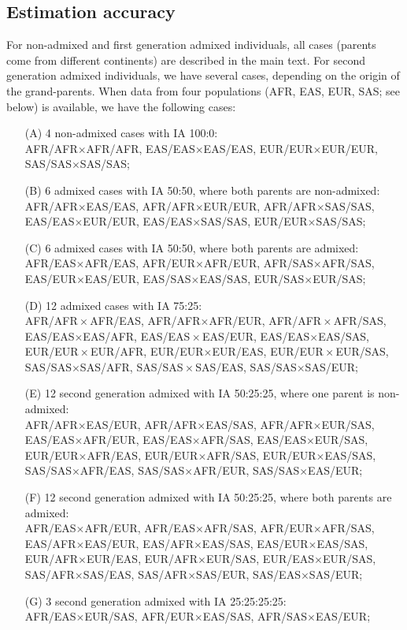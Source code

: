 \documentclass[12pt]{article}
\theoremstyle{definition}
\begin{document}
\newpage

\subsection{Estimation accuracy}
For non-admixed and first generation admixed individuals, all cases (parents come from different continents) are described in the main
text. For second generation admixed individuals, we have several
cases, depending on the origin of the grand-parents.  When data from
four populations (AFR, EAS, EUR, SAS; see below) is available, we have
the following cases:
\begin{itemize}
\item[(A)] 4 non-admixed cases with IA 100:0: \\
  AFR/AFR$\times$AFR/AFR, EAS/EAS$\times$EAS/EAS,
  EUR/EUR$\times$EUR/EUR, SAS/SAS$\times$SAS/SAS;
\item[(B)] 6 admixed cases with IA 50:50, where both
  parents are non-admixed:\\
  AFR/AFR$\times$EAS/EAS, AFR/AFR$\times$EUR/EUR,
  AFR/AFR$\times$SAS/SAS, EAS/EAS$\times$EUR/EUR,
  EAS/EAS$\times$SAS/SAS, EUR/EUR$\times$SAS/SAS;
\item[(C)] 6 admixed cases with IA 50:50, where both
  parents are admixed:\\
  AFR/EAS$\times$AFR/EAS, AFR/EUR$\times$AFR/EUR,
  AFR/SAS$\times$AFR/SAS, EAS/EUR$\times$EAS/EUR,
  EAS/SAS$\times$EAS/SAS, EUR/SAS$\times$EUR/SAS;
\item[(D)] 12 admixed cases with IA 75:25:\\
  AFR/AFR$\!\times$AFR/EAS, AFR/AFR$\times$AFR/EUR,
  AFR/AFR$\!\times$AFR/SAS, EAS/EAS$\times$EAS/AFR,
  EAS/EAS$\!\times$EAS/EUR, EAS/EAS$\times$EAS/SAS,
  EUR/EUR$\!\times$EUR/AFR, EUR/EUR$\times$EUR/EAS,
  EUR/EUR$\!\times$EUR/SAS, SAS/SAS$\times$SAS/AFR,
  SAS/SAS$\!\times$SAS/EAS, SAS/SAS$\times$SAS/EUR;
\item[(E)] 12 second generation admixed with IA 50:25:25,
  where one parent is non-admixed:\\
  AFR/AFR$\times$EAS/EUR, AFR/AFR$\times$EAS/SAS,
  AFR/AFR$\times$EUR/SAS, EAS/EAS$\times$AFR/EUR,
  EAS/EAS$\times$AFR/SAS, EAS/EAS$\times$EUR/SAS,
  EUR/EUR$\times$AFR/EAS, EUR/EUR$\times$AFR/SAS,
  EUR/EUR$\times$EAS/SAS, SAS/SAS$\times$AFR/EAS,
  SAS/SAS$\times$AFR/EUR, SAS/SAS$\times$EAS/EUR;
\item[(F)] 12 second generation admixed with IA 50:25:25,
  where both parents are admixed:\\
  AFR/EAS$\times$AFR/EUR, AFR/EAS$\times$AFR/SAS,
  AFR/EUR$\times$AFR/SAS, EAS/AFR$\times$EAS/EUR,
  EAS/AFR$\times$EAS/SAS, EAS/EUR$\times$EAS/SAS,
  EUR/AFR$\times$EUR/EAS, EUR/AFR$\times$EUR/SAS,
  EUR/EAS$\times$EUR/SAS, SAS/AFR$\times$SAS/EAS,
  SAS/AFR$\times$SAS/EUR, SAS/EAS$\times$SAS/EUR;
\item[(G)] 3 second generation admixed with IA
  25:25:25:25:\\
  AFR/EAS$\times$EUR/SAS, AFR/EUR$\times$EAS/SAS,
  AFR/SAS$\times$EAS/EUR;
\end{itemize}
\end{document}
